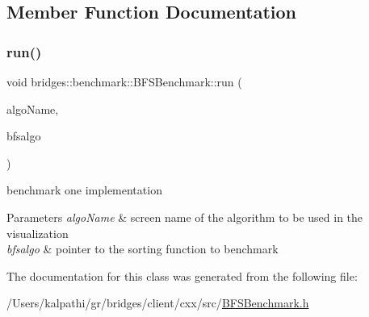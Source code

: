\subsection{Member Function Documentation}
\mbox{\label{classbridges_1_1benchmark_1_1_b_f_s_benchmark_a8ac66a16c89ecc01b43dc88f9246885c}} 
\subsubsection{\texorpdfstring{run()}{run()}}
{\footnotesize\ttfamily void bridges\+::benchmark\+::\+B\+F\+S\+Benchmark\+::run (\begin{DoxyParamCaption}\item[{std\+::string}]{algo\+Name,  }\item[{void($\ast$)(const \mbox{\hyperlink{classbridges_1_1datastructure_1_1_graph_adj_list}{Graph\+Adj\+List}}$<$ std\+::string $>$ \&gr, std\+::string root, std\+::unordered\+\_\+map$<$ std\+::string, int $>$ \&level, std\+::unordered\+\_\+map$<$ std\+::string, std\+::string $>$ \&parent)}]{bfsalgo }\end{DoxyParamCaption})\hspace{0.3cm}{\ttfamily [inline]}}



benchmark one implementation 


\begin{DoxyParams}{Parameters}
{\em algo\+Name} & screen name of the algorithm to be used in the visualization \\
\hline
{\em bfsalgo} & pointer to the sorting function to benchmark \\
\hline
\end{DoxyParams}


The documentation for this class was generated from the following file\+:\begin{DoxyCompactItemize}
\item 
/\+Users/kalpathi/gr/bridges/client/cxx/src/\mbox{\hyperlink{_b_f_s_benchmark_8h}{B\+F\+S\+Benchmark.\+h}}\end{DoxyCompactItemize}
